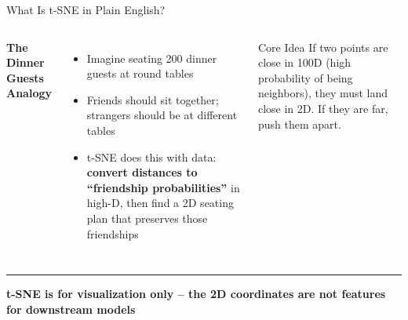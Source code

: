 \documentclass[8pt,aspectratio=169]{beamer}
\newcommand{\bottomnote}[1]{%
\vfill
\vspace{-2mm}
\textcolor{mllavender2}{\rule{\textwidth}{0.4pt}}
\vspace{1mm}
\footnotesize
\textbf{#1}
}
\newenvironment{compactlist}{%
  \begin{itemize}%
    \setlength{\itemsep}{2pt}%
    \setlength{\parskip}{0pt}%
    \setlength{\parsep}{0pt}%
}{%
  \end{itemize}%
}
\newcommand{\highlight}[1]{\textcolor{mlorange}{\textbf{#1}}}
\begin{document}
\begin{frame}[t]{What Is t-SNE in Plain English?}
\begin{columns}[T]
\small
\textbf{The Dinner Guests Analogy}
\begin{compactlist}
\item Imagine seating 200 dinner guests at round tables
\item Friends should sit together; strangers should be at different tables
\item t-SNE does this with data: \highlight{convert distances to ``friendship probabilities''} in high-D, then find a 2D seating plan that preserves those friendships
\end{compactlist}

\begin{block}{Core Idea}
\scriptsize If two points are close in 100D (high probability of being neighbors), they must land close in 2D. If they are far, push them apart.
\end{block}

\vspace{2mm}
\footnotesize
{}
\end{columns}

\bottomnote{t-SNE is for visualization only -- the 2D coordinates are not features for downstream models}
\end{frame}
\end{document}
